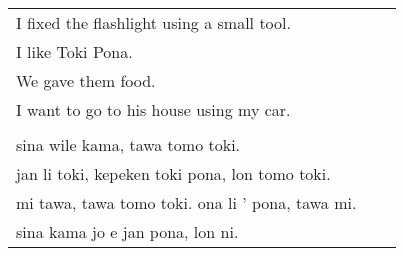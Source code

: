 \begin{supertabular}{p{5,5cm}|ll}
I fixed the flashlight using a small tool.  &&  \\  %
I like Toki Pona.  &&  \\  %
We gave them food.  &&  \\ %
I want to go to his house using my car.  &&  \\  %
&& \\ %
sina wile kama, tawa tomo toki.  &&  \\ %
jan li toki, kepeken toki pona, lon tomo toki.  &&  \\ %
mi tawa, tawa tomo toki. ona li ' pona, tawa mi.  &&  \\ %
sina kama jo e jan pona, lon ni.  &&  \\ %
\end{supertabular} 


%
